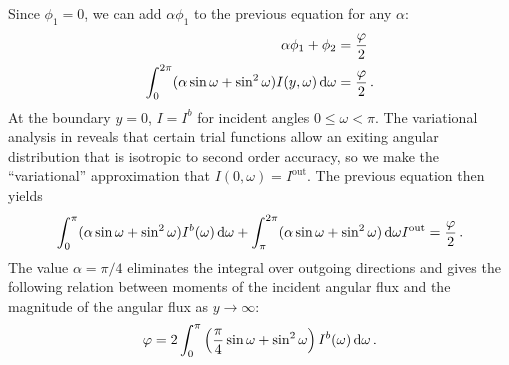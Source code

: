 Since $\phi_1=0$, we can add $\alpha \phi_1$ to the previous equation for any
$\alpha$:
\begin{align*}
 \alpha\phi_1 + \phi_{2} &= \frac{\varphi}{2} \\
 \int_{0}^{2\pi} (\alpha \sin\omega + \sin^2\omega)
 I(y,\omega) \mathop{}\!\mathrm{d}\omega
 &= \frac{\varphi}{2}\,.
\end{align*}
At the boundary $y=0$, $I=I^b$ for incident angles $0 \le \omega < \pi$.
The variational analysis in \cite{Mal1991} reveals that certain trial functions
allow an exiting angular distribution that is isotropic to second order accuracy,
so we make the ``variational'' approximation that $I(0,\omega)=I^\text{out}$.
The previous equation then yields
\begin{equation*}
 \int_{0}^{\pi} (\alpha \sin\omega + \sin^2\omega)
 I^b(\omega) \mathop{}\!\mathrm{d}\omega
 + \int_{\pi}^{2\pi} (\alpha \sin\omega + \sin^2\omega)\mathop{}\!\mathrm{d}\omega I^\text{out}
 = \frac{\varphi}{2}\,.
\end{equation*}
The value $\alpha=\pi/4$ eliminates the integral over outgoing directions and
gives the following relation between moments of the incident angular flux and the
magnitude of the angular flux as $y\to\infty$:
\begin{equation}\label{eq:varBoundary}
 \varphi = 2\int_{0}^{\pi} \left( \frac{\pi}{4} \sin\omega + \sin^2\omega \right)
 I^b(\omega) \mathop{}\!\mathrm{d}\omega
 \,.
\end{equation}

